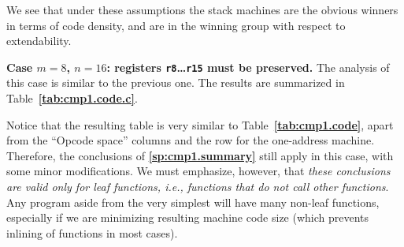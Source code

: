 \documentclass[12pt,oneside]{article}
\def\makepoint#1{\medbreak\noindent{\bf #1.\ }}
\def\nxsubpoint{\refstepcounter{subsubsection}%
  \smallbreak\makepoint{\thesubsubsection}}
\def\refpoint#1{{\rm\textbf{\ref{#1}}}}
\let\ptref=\refpoint
\def\emb#1{\textbf{#1.}}
\begin{document}
We see that under these assumptions the stack machines are the obvious winners in terms of code density, and are in the winning group with respect to extendability.

\nxsubpoint\label{sp:cmp1.8}\emb{Case $m=8$, $n=16$: registers \texttt{r8}\dots\texttt{r15} must be preserved}
The analysis of this case is similar to the previous one. The results are summarized in Table~\ptref{tab:cmp1.code.c}.

\begin{table}\caption{A summary of machine code properties for hypothetical 3-address, 2-address, 1-address and stack machines, generated for a sample leaf function (cf.~\ptref{sp:cmp1.source}), assuming that only the last 8 of the 16 registers must be preserved by called functions ($m=8$, $n=16$). This table is similar to Table~\ptref{tab:cmp1.code.b}, but has smaller values of $r$.}\label{tab:cmp1.code.c}
\end{table}

Notice that the resulting table is very similar to Table~\ptref{tab:cmp1.code}, apart from the ``Opcode space'' columns and the row for the one-address machine. Therefore, the conclusions of \ptref{sp:cmp1.summary} still apply in this case, with some minor modifications. We must emphasize, however, that {\em these conclusions are valid only for leaf functions, i.e., functions that do not call other functions}. Any program aside from the very simplest will have many non-leaf functions, especially if we are minimizing resulting machine code size (which prevents inlining of functions in most cases).
\end{document}
